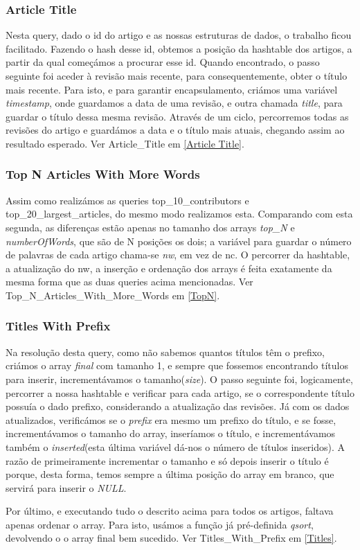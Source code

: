 \documentclass{article}
\begin{document}
\subsubsection{Article Title}
\par Nesta query, dado o id do artigo e as nossas estruturas de dados, o trabalho ficou facilitado. Fazendo o hash desse id, obtemos a posição da hashtable dos artigos, a partir da qual começámos a procurar esse id. Quando encontrado, o passo seguinte foi aceder à revisão mais recente, para consequentemente, obter o título mais recente. Para isto, e para garantir encapsulamento, criámos uma variável \emph{timestamp}, onde guardamos a data de uma revisão, e outra chamada \emph{title}, para guardar o título dessa mesma revisão. Através de um ciclo, percorremos todas as revisões do artigo e guardámos a data e o título mais atuais, chegando assim ao resultado esperado. Ver Article\_Title em \ref{Article Title}.

\subsubsection{Top N Articles With More Words}
\par Assim como realizámos as queries top\_10\_contributors e top\_20\_largest\_articles, do mesmo modo realizamos esta. Comparando com esta segunda, as diferenças estão apenas no tamanho dos arrays \emph{top\_N} e \emph{numberOfWords}, que são de N posições os dois; a variável para guardar o número de palavras de cada artigo chama-se \emph{nw}, em vez de nc. O percorrer da hashtable, a atualização do nw, a inserção e ordenação dos arrays é feita exatamente da mesma forma que as duas queries acima mencionadas. Ver Top\_N\_Articles\_With\_More\_Words em \ref{TopN}.

\subsubsection{Titles With Prefix}
\par Na resolução desta query, como não sabemos quantos títulos têm o prefixo, criámos o array \emph{final} com tamanho 1, e sempre que fossemos encontrando títulos para inserir, incrementávamos o tamanho(\emph{size}). O passo seguinte foi, logicamente, percorrer a nossa hashtable e verificar para cada artigo, se o correspondente título possuía o dado prefixo, considerando a atualização das revisões.  Já com os dados atualizados, verificámos se o \emph{prefix} era mesmo um prefixo do título, e se fosse, incrementávamos o tamanho do array,  inseríamos o título, e incrementávamos também o \emph{inserted}(esta última variável dá-nos o número de títulos inseridos).  A razão de primeiramente incrementar o tamanho e só depois inserir o título é porque, desta forma, temos sempre a última posição do array em branco, que servirá para inserir o \emph{NULL}.
\par Por último, e executando tudo o descrito acima para todos os artigos, faltava apenas ordenar o array. Para isto, usámos a função já pré-definida \emph{qsort}, devolvendo o o array final bem sucedido. Ver Titles\_With\_Prefix em \ref{Titles}.
\end{document}

